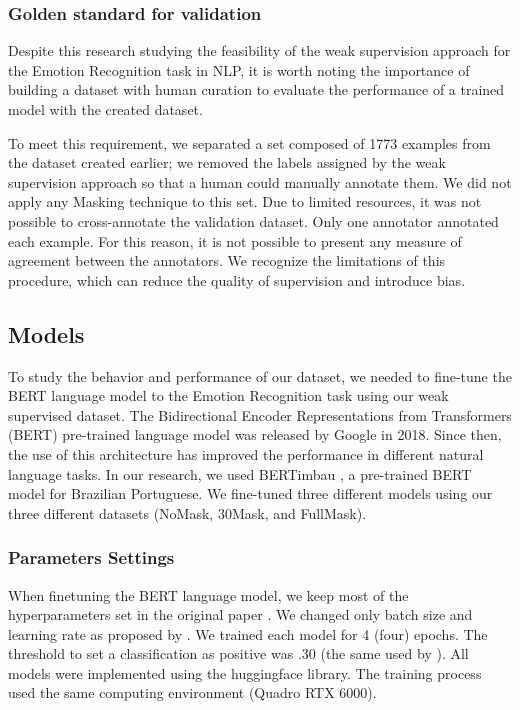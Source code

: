 \documentclass[12pt]{article}
\begin{document}
\subsubsection{Golden standard for validation}
Despite this research studying the feasibility of the weak supervision approach for the Emotion Recognition task in NLP, it is worth noting the importance of building a dataset with human curation to evaluate the performance of a trained model with the created dataset.

To meet this requirement, we separated a set composed of 1773 examples from the dataset created earlier; we removed the labels assigned by the weak supervision approach so that a human could manually annotate them. We did not apply any Masking technique to this set. Due to limited resources, it was not possible to cross-annotate the validation dataset. Only one annotator annotated each example. For this reason, it is not possible to present any measure of agreement between the annotators. We recognize the limitations of this procedure, which can reduce the quality of supervision and introduce bias.


\subsection{Models}

To study the behavior and performance of our dataset, we needed to fine-tune the BERT language model to the Emotion Recognition task using our weak supervised dataset. The Bidirectional Encoder Representations from Transformers (BERT) pre-trained language model \cite{Devlin2018} was released by Google in 2018. Since then, the use of this architecture has improved the performance in different natural language tasks. In our research, we used BERTimbau \cite{Bertimbau}, a pre-trained BERT model for Brazilian Portuguese. We fine-tuned three different models using our three different datasets (NoMask, 30Mask, and FullMask).


\subsubsection{Parameters Settings}
When finetuning the BERT language model, we keep most of the hyperparameters set in the original paper \cite{Devlin2018}. We changed only batch size and learning rate as proposed by \cite{Demszky2020}. We trained each model for 4 (four) epochs. The threshold to set a classification as positive was $.30$ (the same used by \cite{Demszky2020}). All models were implemented using the huggingface library. The training process used the same computing environment (Quadro RTX 6000).
\end{document}
